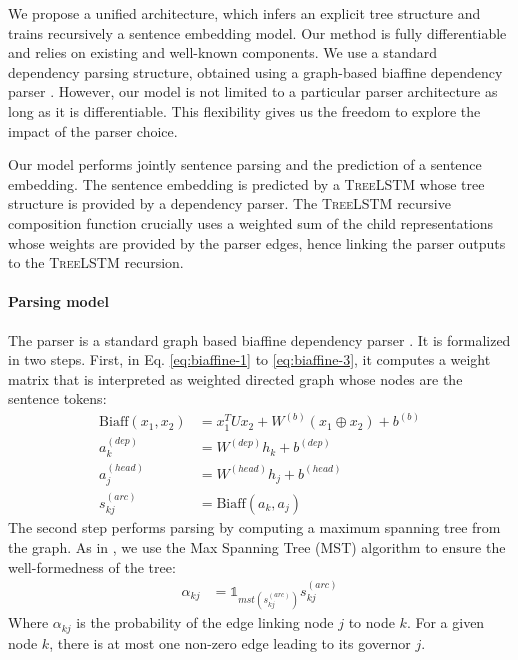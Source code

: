 We propose a unified architecture, which infers an explicit tree structure and trains recursively a sentence embedding model. Our method is fully differentiable and relies on existing and well-known components. We use a standard dependency parsing structure, obtained using a graph-based biaffine dependency parser \parencite{dozat_17}. However, our model is not limited to a particular parser architecture as long as it is differentiable. This flexibility gives us the freedom to explore the impact of the parser choice. 

 Our model performs jointly sentence parsing and the prediction of a sentence embedding. The sentence embedding is predicted by a  \textsc{TreeLSTM} whose tree structure is provided by a dependency parser.
The \textsc{TreeLSTM} recursive composition function crucially uses a weighted sum of the child representations whose weights are provided by the parser edges, hence linking the parser outputs to the \textsc{TreeLSTM} recursion.

\paragraph{Parsing model} The parser is a standard graph based biaffine dependency parser \parencite{dozat_17}.
It is formalized in two steps.
First, in Eq. \ref{eq:biaffine-1} to \ref{eq:biaffine-3},
it computes a weight matrix that is interpreted as weighted directed graph whose nodes are the sentence tokens:
\begin{align}
   \text{Biaff}(x_1,x_2) &=  x_1^T U x_2 + W^{(b)}(x_1 \oplus x_2)+b^{(b)} \\
    a_k^{(dep)} &= W^{(dep)}h_k + b^{(dep)} \label{eq:biaffine-1} \\
    a_j^{(head)} &= W^{(head)}h_j + b^{(head)} \label{eq:biaffine-2}\\
    s^{(arc)}_{kj} &= \text{Biaff}(a_k,a_j) \label{eq:biaffine-3}
\end{align}%
The second step performs parsing by computing a maximum spanning tree from the graph. As in \textcite{dozat_17}, we use the Max Spanning Tree (MST) algorithm  to ensure the well-formedness of the tree: 
\begin{align}
 \alpha_{kj} &= \mathbb{1}_{mst(s^{(arc)}_{kj})} s^{(arc)}_{kj} \label{eq:biaffine-alpha}
\end{align}
Where $\alpha_{kj}$ is the probability of the edge linking node $j$ to node $k$. For a given node $k$, there is at most one non-zero edge leading to its governor $j$.

